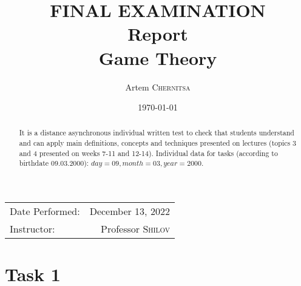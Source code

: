 \documentclass[
	a4paper, %
	11pt, %
]{CSUniSchoolLabReport}
\title{FINAL EXAMINATION \\ Report \\ Game Theory} %
\author{Artem \textsc{Chernitsa}} %
\date{\today} %
\begin{document}
\maketitle %

\begin{center}
	\begin{tabular}{l r}
		Date Performed: & December 13, 2022 \\ %
		Instructor: & Professor \textsc{Shilov} %
	\end{tabular}
\end{center}

\begin{abstract}
    It is a distance asynchronous individual written test to check that students understand and can apply main definitions, concepts and techniques presented on lectures (topics 3 and 4 presented on weeks 7-11 and 12-14). Individual data for tasks (according to birthdate 09.03.2000): $day = 09, month = 03, year = 2000$.
\end{abstract}


\section{Task 1}




\end{document}

